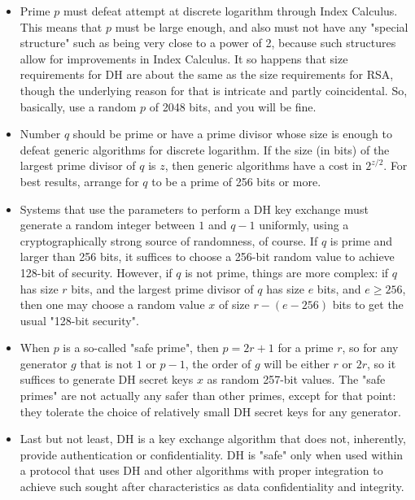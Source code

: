 \begin{itemize}
    \item Prime $p$ must defeat attempt at discrete logarithm through Index Calculus.
    This means that $p$ must be large enough, and also must not have any "special structure"
    such as being very close to a power of 2, because such structures allow for improvements in Index Calculus.
    It so happens that size requirements for DH are about the same as the size requirements for RSA,
    though the underlying reason for that is intricate and partly coincidental.
    So, basically, use a random $p$ of 2048 bits, and you will be fine.
    \item Number $q$ should be prime or have a prime divisor whose size is enough to defeat generic algorithms for
    discrete logarithm.
    If the size (in bits) of the largest prime divisor of $q$ is $z$, then generic algorithms have a cost in $2^{z/2}$.
    For best results, arrange for $q$ to be a prime of 256 bits or more.
    \item Systems that use the parameters to perform a DH key exchange must generate a random integer
    between $1$ and $q-1$ uniformly, using a cryptographically strong source of randomness, of course.
    If $q$ is prime and larger than 256 bits, it suffices to choose a 256-bit random value
    to achieve 128-bit of security.
    However, if $q$ is not prime, things are more complex: if $q$ has size $r$ bits,
    and the largest prime divisor of $q$ has size $e$ bits, and $e \geq 256$,
    then one may choose a random value $x$ of size $r-(e-256)$
    bits to get the usual "128-bit security".
    \item When $p$ is a so-called "safe prime", then $p = 2r+1$ for a prime $r$, so for any generator $g$ that is
    not $1$ or $p-1$, the order of $g$ will be either $r$ or $2r$, so it suffices to generate DH secret keys
    $x$ as random 257-bit values.
    The "safe primes" are not actually any safer than other primes,
    except for that point: they tolerate the choice of relatively small DH secret keys for any generator.
    \item Last but not least, DH is a key exchange algorithm that does not,
    inherently, provide authentication or confidentiality.
    DH is "safe" only when used within a protocol that uses DH and other algorithms with proper
    integration to achieve such sought after characteristics as data confidentiality and integrity.
\end{itemize}

